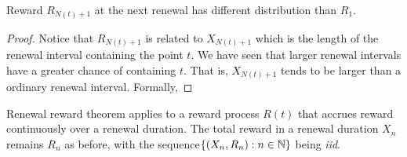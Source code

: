 \documentclass[a4paper,10pt,english]{article}
\begin{document}
\begin{lem} 
Reward $R_{N(t)+1}$ at the next renewal has different distribution than $R_1$.
\end{lem}
\begin{proof}
Notice that $R_{N(t)+1}$ is related to $X_{N(t)+1}$ which is the length of the renewal interval containing the point $t$. 
We have seen that larger renewal intervals have a greater chance of containing $t$. 
That is, $X_{N(t)+1}$ tends to be larger than a ordinary renewal interval. 
Formally,
\end{proof}
\begin{lem}
Renewal reward theorem applies to a reward process $R(t)$ that accrues reward continuously over a renewal duration. 
The total reward in a renewal duration $X_n$ remains $R_n$ as before, with the sequence$\{(X_n,R_n): n\in \mathbb{N}\}$ being \textit{iid}. 
\end{lem}
\end{document}
